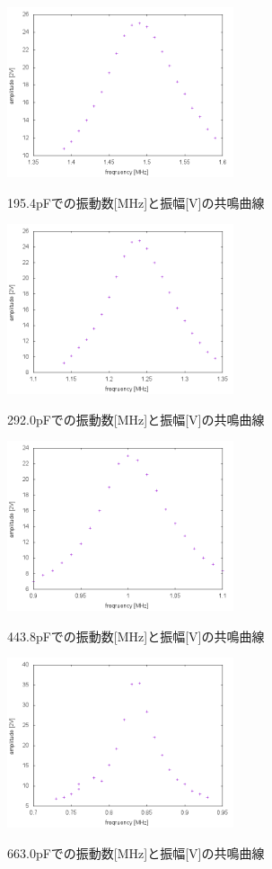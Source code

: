 \begin{figure}[H]
\centering
\includegraphics[height=5cm,clip]{kadono/image/195.png}
\label{fig:195.4}
\caption{195.4pFでの振動数[MHz]と振幅[V]の共鳴曲線}
\end{figure}
\begin{figure}[H]
\centering
\includegraphics[height=5cm,clip]{kadono/image/292.png}
\label{fig:292.0}
\caption{292.0pFでの振動数[MHz]と振幅[V]の共鳴曲線}
\end{figure}
\begin{figure}[H]
\centering
\includegraphics[height=5cm,clip]{kadono/image/443.png}
\label{fig:443.8}
\caption{443.8pFでの振動数[MHz]と振幅[V]の共鳴曲線}
\end{figure}
\begin{figure}[H]
\centering
\includegraphics[height=5cm,clip]{kadono/image/663.png}
\label{fig:663}
\caption{663.0pFでの振動数[MHz]と振幅[V]の共鳴曲線}
\end{figure}
